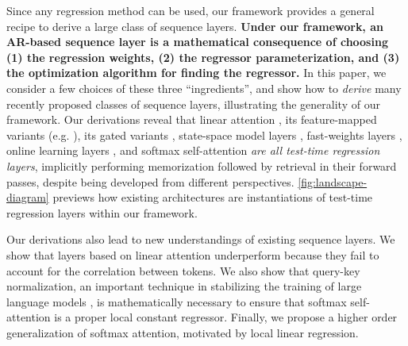 \documentclass[notitlepage, 11pt]{article}
\begin{document}
Since any regression method can be used, our framework provides a general recipe to derive a large class of sequence layers.
\textbf{Under our framework, an AR-based sequence layer is a mathematical consequence of choosing (1) the regression weights, (2) the regressor parameterization, and (3) the optimization algorithm for finding the regressor.}
In this paper, we consider a few choices of these three ``ingredients'', and show how to \emph{derive} many recently proposed classes of sequence layers, illustrating the generality of our framework.
Our derivations reveal that linear attention \citep{Katharopoulos2020TransformersAreRNNs}, its feature-mapped variants (e.g. \citep{Peng2020RandomFeatureAttention,Qin2021CosFormerRethinkingSoftmax,Kasai2021FinetuningPretrainedTransformers,Zhang2023HedgehogPorcupineExpressive,Aksenov2024LinearTransformersLearnable,Chen2024DiJiangEfficientLarge}), its gated variants \citep{Sun2023RetentiveNetworkSuccessor,Orvieto2023ResurrectingRecurrentNeural,Katsch2024GateLoopFullyDataControlled,De2024GriffinMixingGated,Qin2024HGRN2GatedLinear,Peng2024EagleFinchRWKV,Yang2024GatedLinearAttention,Beck2024XLSTMExtendedLong}, state-space model layers \citep{Gu2024MambaLinearTimeSequence,Dao2024TransformersAreSSMs}, fast-weights layers \citep{Schlag2021LinearTransformersAre,Yang2024GatedDeltaNetworks,Yang2024GatedDeltaNetworks}, online learning layers \citep{Liu2024LonghornStateSpace,Sun2024LearningLearnTest,Yang2024GatedDeltaNetworks,Behrouz2024TitansLearningMemorize}, and softmax self-attention \citep{Vaswani2017AttentionAllYou} \emph{are all test-time regression layers}, implicitly performing memorization followed by retrieval in their forward passes, despite being developed from different perspectives.
\autoref{fig:landscape-diagram} previews how existing architectures are instantiations of test-time regression layers within our framework.

Our derivations also lead to new understandings of existing sequence layers.
We show that layers based on linear attention underperform because they fail to account for the correlation between tokens.
We also show that query-key normalization, an important technique in stabilizing the training of large language models \citep{Dehghani2023ScalingVisionTransformers,Wortsman2023SmallscaleProxiesLargescale}, is mathematically necessary to ensure that softmax self-attention is a proper local constant regressor.
Finally, we propose a higher order generalization of softmax attention, motivated by local linear regression.
\end{document}

